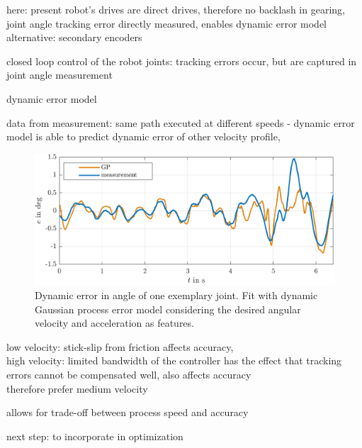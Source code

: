 \documentclass[5p,times,procedia]{elsarticle}
\begin{document}
here: present robot's drives are direct drives, therefore no backlash in gearing, joint angle tracking error directly measured, 
enables dynamic error model
alternative: secondary encoders~\cite{Mesmer22}

closed loop control of the robot joints: tracking errors occur, but are captured in joint angle measurement

dynamic error model

data from measurement: same path executed at different speeds - dynamic error model is able to predict dynamic error of other velocity profile,

\begin{figure}[h]
	\centering
	\includegraphics[width=\columnwidth]{graphics/GP_eOf_dqDes_ddqDes_trainedOnFastestAndSlowest.png}
	\caption{Dynamic error in angle of one exemplary joint. Fit with dynamic Gaussian process error model considering the desired angular velocity and acceleration as features.}
	\label{fig:error_sources}
\end{figure}

low velocity: stick-slip from friction affects accuracy,\\
high velocity: limited bandwidth of the controller has the effect that tracking errors cannot be compensated well, also affects accuracy \\
therefore prefer medium velocity

allows for trade-off between process speed and accuracy

next step: to incorporate in optimization
\end{document}
